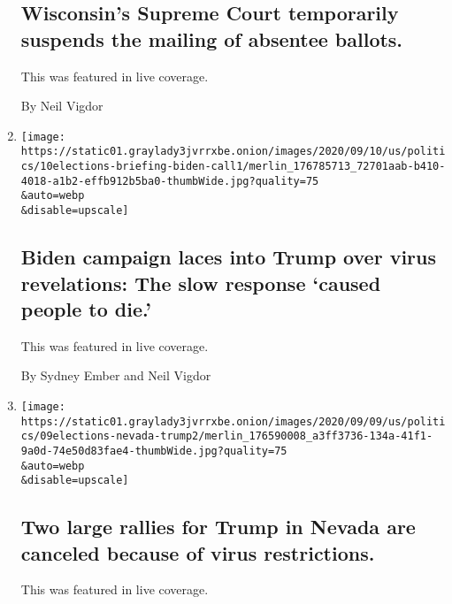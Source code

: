 \begin{enumerate}
{  \subsection{Wisconsin's Supreme Court temporarily suspends the mailing
  of absentee
  ballots.}\label{wisconsins-supreme-court-temporarily-suspends-the-mailing-of-absentee-ballots}}

  This was featured in live coverage.

  By Neil Vigdor
\item
  \href{/live/2020/09/10/us/trump-vs-biden/biden-campaign-laces-into-trump-over-virus-revelations-the-slow-response-caused-people-to-die}{}

  \texttt{[image: https://static01.graylady3jvrrxbe.onion/images/2020/09/10/us/politics/10elections-briefing-biden-call1/merlin\_176785713\_72701aab-b410-4018-a1b2-effb912b5ba0-thumbWide.jpg?quality=75\\\&auto=webp\\\&disable=upscale]}

  \hypertarget{biden-campaign-laces-into-trump-over-virus-revelations-the-slow-response-caused-people-to-die}{%
  \subsection{Biden campaign laces into Trump over virus revelations:
  The slow response `caused people to
  die.'}\label{biden-campaign-laces-into-trump-over-virus-revelations-the-slow-response-caused-people-to-die}}

  This was featured in live coverage.

  By Sydney Ember and Neil Vigdor
\item
  \href{/live/2020/09/09/us/trump-vs-biden/two-large-rallies-for-trump-in-nevada-are-canceled-because-of-virus-restrictions}{}

  \texttt{[image: https://static01.graylady3jvrrxbe.onion/images/2020/09/09/us/politics/09elections-nevada-trump2/merlin\_176590008\_a3ff3736-134a-41f1-9a0d-74e50d83fae4-thumbWide.jpg?quality=75\\\&auto=webp\\\&disable=upscale]}

  \hypertarget{two-large-rallies-for-trump-in-nevada-are-canceled-because-of-virus-restrictions}{%
  \subsection{Two large rallies for Trump in Nevada are canceled because
  of virus
  restrictions.}\label{two-large-rallies-for-trump-in-nevada-are-canceled-because-of-virus-restrictions}}

  This was featured in live coverage.


\end{enumerate}
